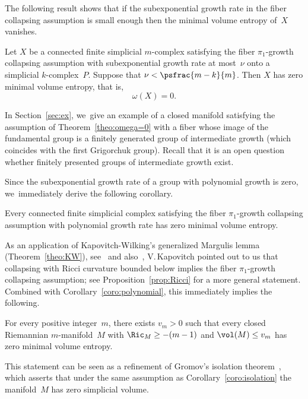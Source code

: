The following result shows that if the subexponential growth rate in the fiber collapsing assumption is small enough then the minimal volume entropy of~$X$ vanishes.

\begin{theorem} \label{theo:omega=0}
Let $X$ be a connected finite simplicial $m$\nobreakdash-complex satisfying the fiber $\pi_1$-growth collapsing assumption with subexponential growth rate at most~$\nu$ onto a simplicial $k$-complex~$P$.
Suppose that $\nu < \psfrac{m-k}{m}$.
Then $X$ has zero minimal volume entropy, that is,\vspace*{-5pt}
\[
\omega(X) = 0.
\]
\end{theorem}

In Section~\ref{sec:ex}, we~give an example of a closed manifold satisfying the assumption of Theorem~\ref{theo:omega=0} with a fiber whose image of the fundamental group is a finitely generated group of intermediate growth (which coincides with the first Grigorchuk group).
Recall that it is an open question whether finitely presented groups of intermediate growth exist.

Since the subexponential growth rate of a group with polynomial growth is zero, we~immediately derive the following corollary.

\begin{corollary} \label{coro:polynomial}
Every connected finite simplicial complex satisfying the fiber $\pi_1$\nobreakdash-growth collapsing assumption with polynomial growth rate has zero minimal volume entropy.
\end{corollary}

As an application of Kapovitch-Wilking's generalized Margulis lemma (Theorem~\ref{theo:KW}), see~\cite{KW} and also~\cite{courtois}, V.\,Kapovitch pointed out to us that collapsing with
Ricci curvature bounded below implies the fiber $\pi_1$-growth collapsing assumption; see Proposition~\ref{prop:Ricci} for a more general statement.
Combined with Corollary~\ref{coro:polynomial}, this immediately implies the following.

\begin{corollary} \label{coro:isolation}
For every positive integer~$m$, there exists $v_m>0$ such that every closed Riemannian $m$\nobreakdash-manifold~$M$ with $\Ric_M \geq -(m-1)$ and $\vol(M) \leq v_m$ has zero minimal volume entropy.
\end{corollary}

This statement can be seen as a refinement of Gromov's isolation theorem~\cite[\S0.5]{gro82}, which asserts that under the same assumption as Corollary~\ref{coro:isolation} the manifold~$M$ has zero simplicial volume.

